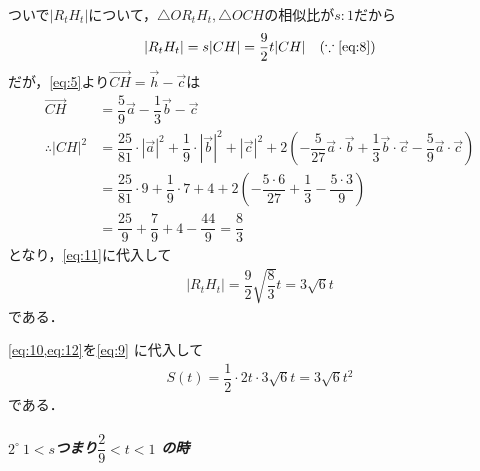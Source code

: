 \documentclass[../../main.tex]{subfiles}
\begin{document}
ついで$|R_tH_t|$について，$\triangle OR_tH_t, \triangle OCH$の相似比が$s:1$だから
\begin{align}
  |R_tH_t| = s |CH| = \dfrac{9}{2}t|CH| \quad (\because\text{\cref{eq:8}})\label{eq:11}
\end{align}
だが，\cref{eq:5}より$\overrightarrow{CH}=\vec{h}-\vec{c}$は
\begin{align}
  \overrightarrow{CH}
  &= \dfrac{5}{9}\vec{a} - \dfrac{1}{3}\vec{b} - \vec{c} \\
  \therefore
  |CH|^2
  &= \dfrac{25}{81}\cdot |\vec{a}|^2 + \dfrac{1}{9}\cdot |\vec{b}|^2 + |\vec{c}|^2
  + 2\left(-\dfrac{5}{27}\vec{a}\cdot\vec{b} + \dfrac{1}{3}\vec{b}\cdot\vec{c} - \dfrac{5}{9}\vec{a}\cdot\vec{c}\right) \\
  &= \dfrac{25}{81}\cdot 9 + \dfrac{1}{9}\cdot 7 + 4 + 2\left(-\dfrac{5\cdot 6}{27} + \dfrac{1}{3} - \dfrac{5\cdot 3}{9}\right) \\
  &= \dfrac{25}{9} + \dfrac{7}{9} + 4 - \dfrac{44}{9} = \dfrac{8}{3}
\end{align}
となり，\cref{eq:11}に代入して
\begin{align}
  |R_tH_t| = \dfrac{9}{2}\sqrt{\dfrac{8}{3}}t = 3\sqrt{6}t \label{eq:12}
\end{align}
である．

\cref{eq:10,eq:12}を\cref{eq:9} に代入して
\begin{align}
  S(t) = \dfrac{1}{2} \cdot 2t \cdot 3\sqrt{6}t = 3\sqrt{6}t^2 \label{eq:13}
\end{align}
である．

\subparagraph{$2^\circ \ 1 < s$つまり$\dfrac{2}{9} < t < 1$ の時}
\end{document}

